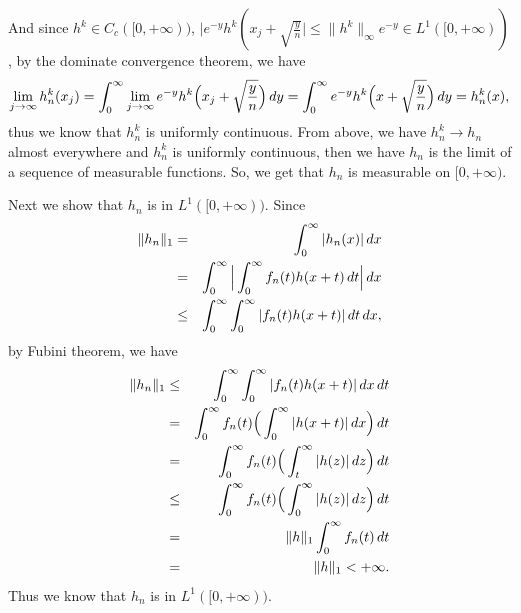 \documentclass[12pt,a4paper]{ctexart}
\begin{document}
And since $h^{k} \in C_{c}([0, + \infty))$, $| e^{-y} h^{k} ( x_{j} + \sqrt{\frac{y}{n}} | \leq \|h^{k}\|_{\infty} e^{-y} \in L^{1}([0, + \infty))$, by the dominate convergence theorem, we have
\begin{equation*}
    \lim_{j \to \infty} h_{n}^{k} (x_{j}) = \int_{0}^{\infty} \lim_{j \to \infty} e^{-y} h^{k} \Big{(} x_{j} + \sqrt{\frac{y}{n}} \Big{)} \, d y = \int_{0}^{\infty} e^{-y} h^{k} \Big{(} x + \sqrt{\frac{y}{n}} \Big{)} \, d y = h_{n}^{k} (x),
\end{equation*}
thus we know that $h_{n}^{k}$ is uniformly continuous. From above, we have $h_{n}^{k} \to h_{n}$ almost everywhere and $h_{n}^{k}$ is uniformly continuous, then we have $h_{n}$ is the limit of a sequence of measurable functions. So, we get that $h_{n}$ is measurable on $[0, + \infty)$.

Next we show that $h_{n}$ is in $L^{1}([0, + \infty))$. Since
\begin{eqnarray*}
\|h_{n}\|_{1}  & = & \int_{0}^{\infty} |h_{n} (x)| \, d x  \\
 & = & \int_{0}^{\infty} \Big{|} \int_{0}^{\infty} f_{n} (t) h(x + t) \, d t  \Big{|} \, d x \\
 & \leq & \int_{0}^{\infty} \int_{0}^{\infty} | f_{n} (t) h(x + t) | \, d t \, d x, 
\end{eqnarray*}
by Fubini theorem, we have
\begin{eqnarray*}
\|h_{n}\|_{1}  & \leq & \int_{0}^{\infty} \int_{0}^{\infty} | f_{n} (t) h(x + t) | \, d x \, d t \\
& = & \int_{0}^{\infty} f_{n} (t) \Big{(} \int_{0}^{\infty}  | h(x + t) | \, d x \Big{)} \, d t \\
& = & \int_{0}^{\infty} f_{n} (t) \Big{(} \int_{t}^{\infty}  | h(z) | \, d z \Big{)} \, d t \\
& \leq & \int_{0}^{\infty} f_{n} (t) \Big{(} \int_{0}^{\infty}  | h(z) | \, d z \Big{)} \, d t \\
& = & \|h\|_{1} \int_{0}^{\infty} f_{n} (t) \, d t \\ 
& = & \|h\|_{1} < + \infty.
\end{eqnarray*}
Thus we know that $h_{n}$ is in $L^{1}([0, + \infty))$.
\end{document}
